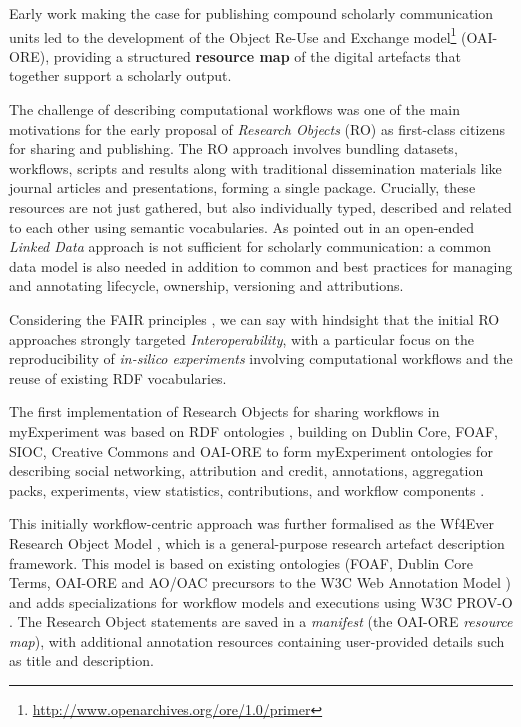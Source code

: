 Early work making the case for publishing compound scholarly
communication units
\cite{Van de Sompel 2007}
led to the development of the
Object Re-Use and Exchange
model\footnote{\url{http://www.openarchives.org/ore/1.0/primer}} (OAI-ORE), providing a structured \textbf{resource map}
of the digital artefacts that together support a scholarly output.

The challenge of describing computational workflows was one of the main
motivations for the early proposal of \emph{Research Objects} (RO)
\cite{Bechhofer 2013}
as first-class citizens for sharing and publishing. The RO approach
involves bundling datasets, workflows, scripts and results along with
traditional dissemination materials like journal articles and
presentations, forming a single package. Crucially, these resources are
not just gathered, but also individually typed, described and related to
each other using semantic vocabularies. As pointed out in
\cite{Bechhofer 2013} an
open-ended \emph{Linked Data} approach is not sufficient for scholarly
communication: a common data model is also needed in addition to common
and best practices for managing and annotating lifecycle, ownership,
versioning and attributions.

Considering the FAIR principles
\cite{Wilkinson 2016}, we can say with
hindsight that the initial RO approaches strongly targeted
\emph{Interoperability}, with a particular focus on the reproducibility
of \emph{in-silico experiments} involving computational workflows and
the reuse of existing RDF vocabularies.

The first implementation of Research Objects for sharing workflows in
myExperiment \cite{Goble 2010} was
based on RDF ontologies
\cite{Newman 2009}, building on
Dublin Core, FOAF, SIOC, Creative Commons and OAI-ORE to form
myExperiment ontologies for describing social networking, attribution
and credit, annotations, aggregation packs, experiments, view
statistics, contributions, and workflow components
\cite{myExperiment 2009}.

This initially workflow-centric approach was further formalised as the
Wf4Ever Research Object Model
\cite{Belhajjame 2015}, which is
a general-purpose research artefact description framework. This model is
based on existing ontologies (FOAF, Dublin Core Terms, OAI-ORE and
AO/OAC precursors to the W3C Web Annotation Model
\cite{Ciccarese 2017})
and adds specializations for workflow models and executions using W3C
PROV-O \cite{Lebo 2013a}.
The Research Object statements are saved in a \emph{manifest} (the
OAI-ORE \emph{resource map}), with additional annotation resources
containing user-provided details such as title and description.

